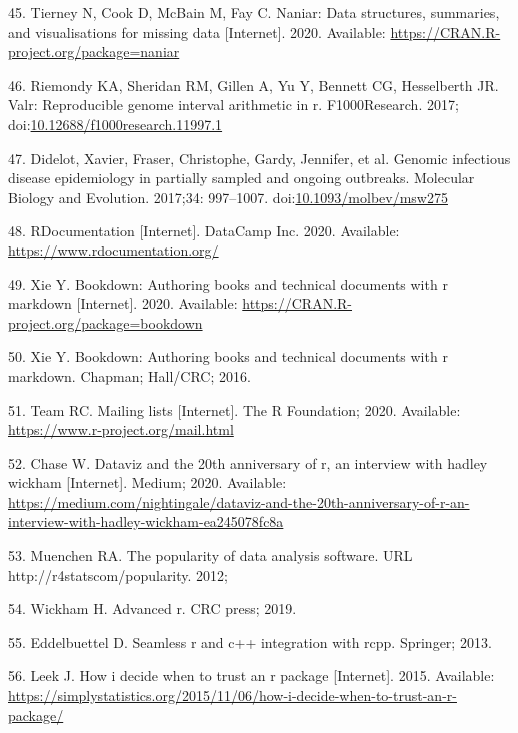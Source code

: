 \documentclass[10pt,letterpaper]{article}
\begin{document}
\leavevmode\hypertarget{ref-naniar}{}%
45. Tierney N, Cook D, McBain M, Fay C. Naniar: Data structures,
summaries, and visualisations for missing data {[}Internet{]}. 2020.
Available: \url{https://CRAN.R-project.org/package=naniar}

\leavevmode\hypertarget{ref-valr}{}%
46. Riemondy KA, Sheridan RM, Gillen A, Yu Y, Bennett CG, Hesselberth
JR. Valr: Reproducible genome interval arithmetic in r. F1000Research.
2017;
doi:\href{https://doi.org/10.12688/f1000research.11997.1}{10.12688/f1000research.11997.1}

\leavevmode\hypertarget{ref-TransPhylo}{}%
47. Didelot, Xavier, Fraser, Christophe, Gardy, Jennifer, et al. Genomic
infectious disease epidemiology in partially sampled and ongoing
outbreaks. Molecular Biology and Evolution. 2017;34: 997--1007.
doi:\href{https://doi.org/10.1093/molbev/msw275}{10.1093/molbev/msw275}

\leavevmode\hypertarget{ref-rdocumentation}{}%
48. RDocumentation {[}Internet{]}. DataCamp Inc. 2020. Available:
\url{https://www.rdocumentation.org/}

\leavevmode\hypertarget{ref-bookdown}{}%
49. Xie Y. Bookdown: Authoring books and technical documents with r
markdown {[}Internet{]}. 2020. Available:
\url{https://CRAN.R-project.org/package=bookdown}

\leavevmode\hypertarget{ref-xie2016}{}%
50. Xie Y. Bookdown: Authoring books and technical documents with r
markdown. Chapman; Hall/CRC; 2016.

\leavevmode\hypertarget{ref-Rmail2020}{}%
51. Team RC. Mailing lists {[}Internet{]}. The R Foundation; 2020.
Available: \url{https://www.r-project.org/mail.html}

\leavevmode\hypertarget{ref-chase2020}{}%
52. Chase W. Dataviz and the 20th anniversary of r, an interview with
hadley wickham {[}Internet{]}. Medium; 2020. Available:
\url{https://medium.com/nightingale/dataviz-and-the-20th-anniversary-of-r-an-interview-with-hadley-wickham-ea245078fc8a}

\leavevmode\hypertarget{ref-muenchen2012}{}%
53. Muenchen RA. The popularity of data analysis software. URL
http://r4statscom/popularity. 2012;

\leavevmode\hypertarget{ref-wickham2019}{}%
54. Wickham H. Advanced r. CRC press; 2019.

\leavevmode\hypertarget{ref-eddelbuettel2013}{}%
55. Eddelbuettel D. Seamless r and c++ integration with rcpp. Springer;
2013.

\leavevmode\hypertarget{ref-leek2015}{}%
56. Leek J. How i decide when to trust an r package {[}Internet{]}.
2015. Available:
\url{https://simplystatistics.org/2015/11/06/how-i-decide-when-to-trust-an-r-package/}
\end{document}
